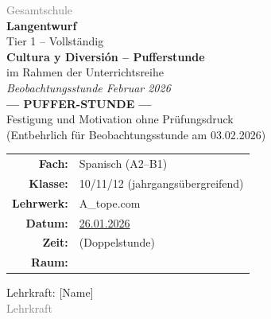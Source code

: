 \documentclass[11pt,a4paper]{article}
\newcommand{\fach}{Spanisch}
\newcommand{\jahrgangsstufe}{10/11/12 (jahrgangsübergreifend)}
\newcommand{\schulart}{Gesamtschule}
\newcommand{\stundenthema}{Cultura y Diversión -- Pufferstunde}
\newcommand{\reihenthema}{Beobachtungsstunde Februar 2026}
\newcommand{\unterrichtsdatum}{26.01.2026}
\newcommand{\lehrkraft}{[Name]}
\newcommand{\ausbildungsstand}{Lehrkraft}
\newcommand{\gerniveau}{A2--B1}
\newcommand{\lehrwerk}{A\_tope.com}
\begin{document}
\begin{titlepage}
    \centering
    \vspace*{2cm}

    {\large\textcolor{gray}{\schulart}}\\[2cm]

    {\Huge\textcolor{fach}{\textbf{Langentwurf}}}\\[0.5cm]
    {\large Tier 1 -- Vollständig}\\[2cm]

    {\LARGE\textbf{\stundenthema}}\\[0.5cm]
    {\large im Rahmen der Unterrichtsreihe}\\[0.3cm]
    {\Large\textit{\reihenthema}}\\[1cm]

    \textcolor{puffer}{\Large\textbf{--- PUFFER-STUNDE ---}}\\[0.3cm]
    {\normalsize Festigung und Motivation ohne Prüfungsdruck}\\[0.3cm]
    {\small (Entbehrlich für Beobachtungsstunde am 03.02.2026)}\\[1.5cm]

    \begin{tabular}{rl}
        \textbf{Fach:} & \fach{} (\gerniveau) \\[0.3cm]
        \textbf{Klasse:} & \jahrgangsstufe \\[0.3cm]
        \textbf{Lehrwerk:} & \lehrwerk \\[0.3cm]
        \textbf{Datum:} & \underline{\hspace{1cm}\unterrichtsdatum\hspace{1cm}} \\[0.3cm]
        \textbf{Zeit:} & \underline{\hspace{3cm}} (Doppelstunde) \\[0.3cm]
        \textbf{Raum:} & \underline{\hspace{3cm}} \\[0.3cm]
    \end{tabular}

    \vfill

    {\large Lehrkraft: \lehrkraft}\\[0.3cm]
    {\normalsize\textcolor{gray}{\ausbildungsstand}}\\[1cm]

\end{titlepage}
\end{document}

